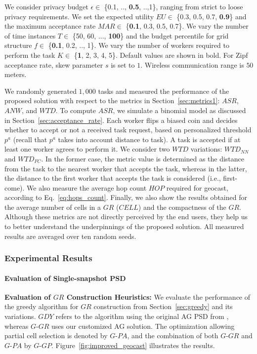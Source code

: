 \documentclass{USC-Thesis}
\renewcommand\bf\bfseries  %
\numberwithin{equation}{chapter}
\begin{document}
We consider privacy budget $\epsilon \in$ \{0.1, .., {\bf 0.5}, ..,1\}, ranging from strict to loose privacy requirements. We set the expected utility $\mathit{EU} \in$ \{0.3, 0.5, 0.7, {\bf 0.9}\} and the maximum acceptance rate $\mathit{MAR}\in$ \{{\bf 0.1}, 0.3, 0.5, 0.7\}. We vary the number of time instances $T\in$ \{50, 60, ..., {\bf 100}\} and the budget percentile for grid structure $f\in$ \{{\bf 0.1}, 0.2, .., 1\}. We vary the number of workers required to perform the task $K\in$ \{{\bf 1}, 2, 3, 4, 5\}. Default values are shown in bold. For Zipf acceptance rate, skew parameter $s$ is set to $1$. Wireless communication range is $50$ meters.

We randomly generated $1,000$ tasks and measured the performance of the proposed solution with respect to the metrics in Section~\ref{sec:metrics1}: $\mathit{ASR}$, $\mathit{ANW}$, and $\mathit{WTD}$. 
To compute $\mathit{ASR}$, we simulate a binomial model as discussed in Section~\ref{sec:acceptance_rate}. Each worker flips a biased coin and decides whether to accept or not a received task request, based on personalized threshold $p^a$ (recall that $p^a$ takes into account distance to task).
A task is accepted if at least one worker agrees to perform it.
We consider two $WTD$ variations: $WTD_{NN}$ and $WTD_{FC}$. In the former case, the metric value is determined as the distance from the task to the nearest worker that accepts the task, whereas in the latter, the distance to the first worker that accepts the task is considered (i.e., first-come).
We also measure the average hop count $\mathit{HOP}$ required for geocast, according to Eq.~\eqref{eq:hops_count}.
Finally, we also show the results obtained for the average number of cells in a $\mathit{GR}$ ($\mathit{CELL}$) and the compactness of the $\mathit{GR}$. Although these metrics are not directly perceived by the end users, they help us to better understand the underpinnings of the proposed solution.
All measured results are averaged over ten random seeds.


\subsubsection{Experimental Results}

\paragraph{Evaluation of Single-snapshot PSD}

\textbf{Evaluation of $\mathit{GR}$ Construction Heuristics:}
We evaluate the performance of the greedy algorithm for $\mathit{GR}$ construction from Section~\ref{sec:greedy} and its variations. $\mathit{GDY}$ refers to the algorithm using the original AG PSD from \cite{qardaji2012differentially}, whereas $G$-$\mathit{GR}$ uses our customized AG solution. The optimization allowing partial cell selection is denoted by $G$-$\mathit{PA}$, and the combination of both $G$-$\mathit{GR}$ and $G$-$\mathit{PA}$ by $G$-$\mathit{GP}$. Figure~\ref{fig:improved_geocast} illustrates the results.
\end{document}
